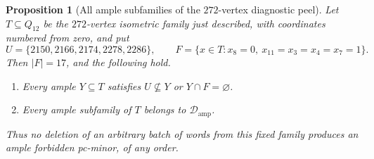 \documentclass[11pt]{article}
\numberwithin{equation}{section}
\newtheorem{proposition}[theorem]{Proposition}
\theoremstyle{definition}
\theoremstyle{remark}
\newcommand{\Damp}{\mathcal D_{\mathrm{amp}}}
\begin{document}
\begin{proposition}[All ample subfamilies of the $272$-vertex diagnostic peel]
\label{prop:native272-cycle-fiber}
Let $T\subseteq Q_{12}$ be the $272$-vertex isometric family just
described, with coordinates numbered from zero, and put
\[
 U=\{2150,2166,2174,2278,2286\},\qquad
 F=\{x\in T:x_8=0,\ x_{11}=x_3=x_4=x_7=1\}.
\]
Then $|F|=17$, and the following hold.
\begin{enumerate}
\item Every ample $Y\subseteq T$ satisfies
      $U\nsubseteq Y$ or $Y\cap F=\varnothing$.
\item Every ample subfamily of $T$ belongs to $\Damp$.
\end{enumerate}
Thus no deletion of an arbitrary batch of words from this fixed family
produces an ample forbidden pc-minor, of any order.
\end{proposition}
\end{document}
